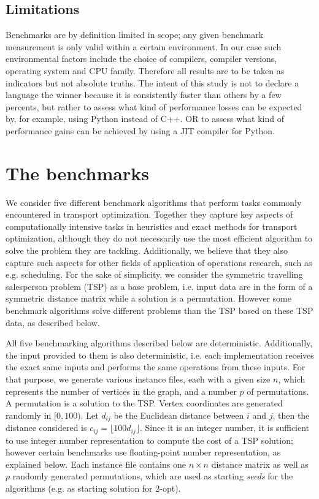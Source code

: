 \documentclass[11pt,a4paper,notitlepage]{article}
\begin{document}
\subsection{Limitations}
Benchmarks are by definition limited in scope; any given benchmark
measurement is only valid within a certain environment. In our case
such environmental factors include the choice of compilers, compiler
versions, operating system and CPU family. Therefore all results are
to be taken as indicators but not absolute truths. The intent of this
study is not to declare a language the winner because it is
consistently faster than others by a few percents, but rather to
assess what kind of performance losses can be expected by, for
example, using Python instead of C++. OR to assess what kind of
performance gains can be achieved by using a JIT compiler for Python.

\section{The benchmarks}
We consider five different benchmark algorithms that perform tasks
commonly encountered in transport optimization. Together they capture
key aspects of computationally intensive tasks in heuristics and
exact methods for transport optimization, although they do not
necessarily use the most efficient algorithm to solve the problem they
are tackling. Additionally, we believe
that they also capture such aspects for other fields of application
of operations research, such as e.g. scheduling. For the sake of
simplicity, we consider the symmetric travelling salesperson problem
(TSP) as a base problem, i.e. input data are in the form of a
symmetric distance matrix while a solution is a permutation. However
some benchmark algorithms solve different problems than the TSP based on these
TSP data, as described below.

All five benchmarking algorithms described below are deterministic.
Additionally, the input provided to them is also deterministic,
i.e. each implementation receives the exact same inputs and performs
the same operations from these inputs. For that purpose, we generate
various instance files, each with a given size $n$, which represents
the number of vertices in the graph, and a number $p$ of
permutations. A permutation is a solution to the TSP.
Vertex coordinates are generated randomly in $[0, 100)$. Let $d_{ij}$
be the Euclidean distance between $i$ and $j$, then the distance
considered is $c_{ij} = \lfloor 100 d_{ij} \rfloor$. Since it is an
integer number, it is sufficient to use integer number representation
to compute the cost of a TSP solution; however certain benchmarks use
floating-point number representation, as explained below.
Each instance
file contains one $n \times n$ distance matrix as well as $p$ randomly
generated permutations, which are used as starting \emph{seeds} for
the algorithms (e.g. as starting solution for 2-opt).
\end{document}
